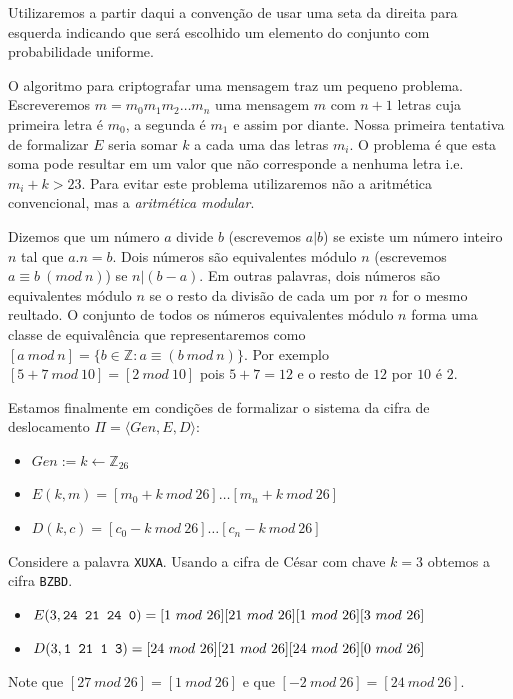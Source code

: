 Utilizaremos a partir daqui a convenção de usar uma seta da direita para esquerda indicando que será escolhido um elemento do conjunto com probabilidade uniforme.

O algoritmo para criptografar uma mensagem traz um pequeno problema.
Escreveremos $m = m_0 m_1 m_2 \dots m_n$ uma mensagem $m$ com $n + 1$ letras cuja primeira letra é $m_0$, a segunda é $m_1$ e assim por diante.
Nossa primeira tentativa de formalizar $E$ seria somar $k$ a cada uma das letras $m_i$.
O problema é que esta soma pode resultar em um valor que não corresponde a nenhuma letra i.e. $m_i + k > 23$.
Para evitar este problema utilizaremos não a aritmética convencional, mas a {\em aritmética modular}.

Dizemos que um número $a$ divide $b$ (escrevemos $a|b$) se existe um número inteiro $n$ tal que $a.n = b$.
Dois números são equivalentes módulo $n$ (escrevemos $a \equiv b\ (mod\ n)$) se $n|(b-a)$.
Em outras palavras, dois números são equivalentes módulo $n$ se o resto da divisão de cada um por $n$ for o mesmo reultado.
O conjunto de todos os números equivalentes módulo $n$ forma uma classe de equivalência que representaremos como $[a\ mod\ n] = \{b \in \mathbb{Z} : a \equiv (b\ mod\ n)\}$.
Por exemplo $[5 + 7\ mod\ 10] = [2\ mod\ 10]$ pois $5 + 7 = 12$ e o resto de $12$ por $10$ é $2$.

Estamos finalmente em condições de formalizar o sistema da cifra de deslocamento $\Pi = \langle Gen, E, D\rangle$:
\begin{itemize}
\item $Gen := k \leftarrow \mathbb{Z}_{26}$
\item $E(k, m) = [m_0 + k\ mod\ 26] \dots [m_n + k\ mod\ 26]$
\item $D(k, c) = [c_0 - k\ mod\ 26] \dots [c_n - k\ mod\ 26]$ 
\end{itemize}


\begin{example}
  Considere a palavra {\tt XUXA}.
  Usando a cifra de César com chave $k = 3$ obtemos a cifra {\tt BZBD}.

  \begin{itemize}
  \item $E(3, \textrm{\tt 24 21 24 0}) = [1\ mod\ 26] [21\ mod\ 26] [1\ mod\ 26] [3\ mod\ 26]$  
  \item $D(3, \textrm{\tt 1 21 1 3}) = [24\ mod\ 26] [21\ mod\ 26] [24\ mod\ 26] [0\ mod\ 26]$
  \end{itemize}

  Note que $[27\ mod\ 26] = [1\ mod\ 26]$ e que $[-2\ mod\ 26] = [24\ mod\ 26]$.
\end{example}



